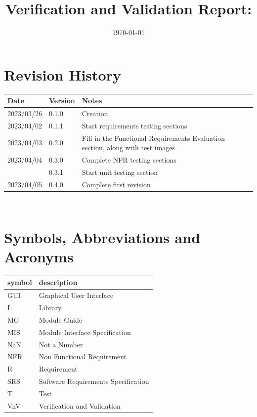 \documentclass[12pt, titlepage]{article}
\begin{document}
\title{Verification and Validation Report: \progname} 
\author{\authname}
\date{\today}
	
\maketitle


\section{Revision History}

\begin{tabularx}{\textwidth}{p{3cm}p{2cm}X}
\toprule {\bf Date} & {\bf Version} & {\bf Notes}\\
\midrule
2023/03/26 & 0.1.0 & Creation\\
2023/04/02 & 0.1.1 & Start requirements testing sections\\
2023/04/03 & 0.2.0 & Fill in the Functional Requirements Evaluation
  section, along with test images\\
2023/04/04 & 0.3.0 & Complete NFR testing sections\\
           & 0.3.1 & Start unit testing section\\
2023/04/05 & 0.4.0 & Complete first revision\\
\bottomrule
\end{tabularx}

~\newpage

\section{Symbols, Abbreviations and Acronyms}

\renewcommand{\arraystretch}{1.2}
\begin{tabular}{l l} 
  \toprule		
  \textbf{symbol} & \textbf{description}\\
  \midrule 
  GUI & Graphical User Interface\\
  L & Library\\
  MG & Module Guide\\
  MIS & Module Interface Specification\\
  NaN & Not a Number\\
  NFR & Non Functional Requirement\\
  R & Requirement\\
  SRS & Software Requirements Specification\\
  T & Test\\
  VnV & Verification and Validation\\
  \bottomrule
\end{tabular}\\
\end{document}
